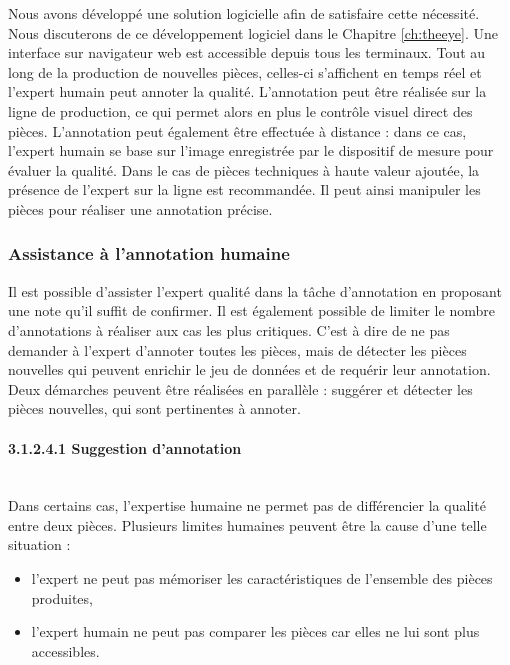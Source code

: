 Nous avons développé une solution logicielle afin de satisfaire cette nécessité.
Nous discuterons de ce développement logiciel dans le Chapitre \ref{ch:theeye}.
Une interface sur navigateur web est accessible depuis tous les terminaux.
Tout au long de la production de nouvelles pièces, celles-ci s'affichent en temps réel et l'expert humain peut annoter la qualité.
L'annotation peut être réalisée sur la ligne de production, ce qui permet alors en plus le contrôle visuel direct des pièces.
L'annotation peut également être effectuée à distance : dans ce cas, l'expert humain se base sur l'image enregistrée par le dispositif de mesure pour évaluer la qualité.
Dans le cas de pièces techniques à haute valeur ajoutée, la présence de l'expert sur la ligne est recommandée.
Il peut ainsi manipuler les pièces pour réaliser une annotation précise.

\subsubsection{Assistance à l'annotation humaine} \label{subsec:labelling_assistance}
Il est possible d'assister l'expert qualité dans la tâche d'annotation en proposant une note qu'il suffit de confirmer.
Il est également possible de limiter le nombre d'annotations à réaliser aux cas les plus critiques.
C'est à dire de ne pas demander à l'expert d'annoter toutes les pièces, mais de détecter les pièces nouvelles qui peuvent enrichir le jeu de données et de requérir leur annotation.
Deux démarches peuvent être réalisées en parallèle : suggérer et détecter les pièces nouvelles, qui sont pertinentes à annoter.

\paragraph{3.1.2.4.1 Suggestion d'annotation}\mbox{} \\
Dans certains cas, l'expertise humaine ne permet pas de différencier la qualité entre deux pièces.
Plusieurs limites humaines peuvent être la cause d'une telle situation :
\begin{itemize}
	\item l'expert ne peut pas mémoriser les caractéristiques de l'ensemble des pièces produites,
	\item l'expert humain ne peut pas comparer les pièces car elles ne lui sont plus accessibles.
\end{itemize}

